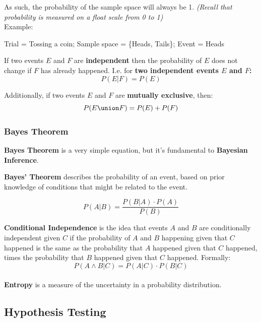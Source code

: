 \documentclass[english, 10pt]{article}
\begin{document}
\hfill \break As such, the probability of the sample space will always be 1. \textit{(Recall that probability is measured on a float scale from 0 to 1)}\\

Example:\\

\begin{myproof}
Trial = Tossing a coin; Sample space = \{Heads, Tails\}; Event = Heads
\end{myproof}

\hfill \break If two events $E$ and $F$ are \textbf{independent} then the probability of $E$ does not change if $F$ has already happened. I.e. for \textbf{two independent events $E$ and $F$:} $$ P(E|F) = P(E) $$

Additionally, if two events $E$ and $F$ are \textbf{mutually exclusive}, then: $$P(E \union F) = P(E) + P(F)$$

\subsubsection{Bayes Theorem}

\textbf{Bayes Theorem} is a very simple equation, but it's fundamental to \textbf{Bayesian Inference}.\\

\begin{tcolorbox}[title=Aside: Bayes' Theorem,colframe=black,colback=white,arc=0pt,fonttitle=\bfseries]
\textbf{Bayes' Theorem} describes the probability of an event, based on prior knowledge of conditions that might be related to the event.

$$ P(A|B) = \frac{P(B|A) \cdot P(A)}{P(B)} $$
\end{tcolorbox}

\hfill \break \textbf{Conditional Independence} is the idea that events $A$ and $B$ are conditionally independent given $C$ if the probability of $A$ and $B$ happening given that $C$ happened is the same as the probability that $A$ happened given that $C$ happened, times the probability that $B$ happened given that $C$ happened. Formally: $$P(A \land B | C) = P(A|C) \cdot P(B|C)$$\\

\textbf{Entropy} is a measure of the uncertainty in a probability distribution.

\subsection{Hypothesis Testing}
\end{document}

